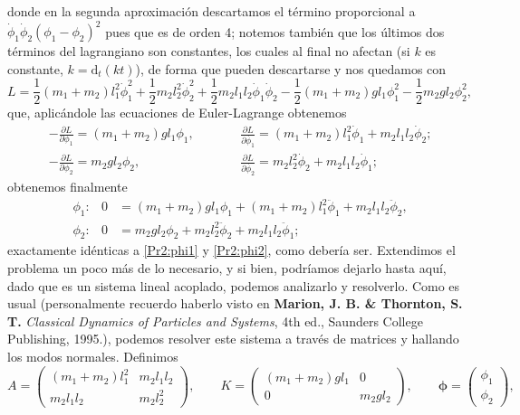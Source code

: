 \documentclass{article}
\begin{document}
donde en la segunda aproximaci\'on descartamos el t\'ermino proporcional a $\dot{\phi}_1 \dot{\phi}_2(\phi_1 - \phi_2)^2$ pues que es de orden 4; notemos tambi\'en que los \'ultimos dos t\'erminos del lagrangiano son constantes, los cuales al final no afectan (si $k$ es constante, $k=\mathrm{d}_t (kt)$), de forma que pueden descartarse y nos quedamos con
\begin{equation}
    L=\frac{1}{2}(m_1+m_2)l_1^2\dot{\phi}_1^2 + \frac{1}{2}m_2l_2^2\dot{\phi}^2_2 + \frac{1}{2}m_2l_1l_2\dot{\phi}_1\dot{\phi}_2 - \frac{1}{2}(m_1+m_2)gl_1\phi_1^2 - \frac{1}{2}m_2gl_2\phi^2_2,
\end{equation}
que, aplic\'andole las ecuaciones de Euler-Lagrange obtenemos
\begin{align*}
    &-\frac{\partial L}{\partial \phi_1} = (m_1+m_2)gl_1\phi_1, &\qquad &\frac{\partial L}{\partial \dot{\phi_1}}=(m_1+m_2)l_1^2\dot{\phi}_1 + m_2l_1l_2\dot{\phi}_2; \nonumber \\
    &-\frac{\partial L}{\partial \phi_2} = m_2gl_2\phi_2, &\qquad &\frac{\partial L}{\partial \dot{\phi_2}}=m_2l_2^2\dot{\phi}_2 + m_2l_1l_2\dot{\phi}_1;
\end{align*}
obtenemos finalmente
\begin{align}
    &\phi_1:& 0&=(m_1+m_2)gl_1\phi_1 + (m_1+m_2)l_1^2\ddot{\phi}_1 + m_2l_1l_2\ddot{\phi}_2, \nonumber \\
    &\phi_2:& 0&=m_2gl_2\phi_2 + m_2l_2^2\ddot{\phi}_2 + m_2l_1l_2\ddot{\phi}_1; \nonumber
\end{align}
exactamente id\'enticas a \eqref{Pr2:phi1} y \eqref{Pr2:phi2}, como deber\'ia ser. Extendimos el problema un poco m\'as de lo necesario, y si bien, podr\'iamos dejarlo hasta aqu\'i, dado que es un sistema lineal acoplado, podemos analizarlo y resolverlo. Como es usual (personalmente recuerdo haberlo visto en \textbf{Marion, J. B. \& Thornton, S. T.} \textit{Classical Dynamics of Particles and Systems}, 4th ed., Saunders College Publishing, 1995.), podemos resolver este sistema a trav\'es de matrices y hallando los modos normales. Definimos
\begin{equation}
    A = \begin{pmatrix}
        (m_1+m_2)l_1^2 & m_2l_1l_2 \\
        m_2l_1l_2 & m_2l_2^2
    \end{pmatrix},
    \qquad
    K = \begin{pmatrix}
        (m_1+m_2)gl_1 & 0 \\
        0 & m_2gl_2
    \end{pmatrix},
    \qquad
    \boldsymbol{\phi} = \begin{pmatrix}
        \phi_1 \\
        \phi_2
    \end{pmatrix},
\end{equation}
\end{document}
